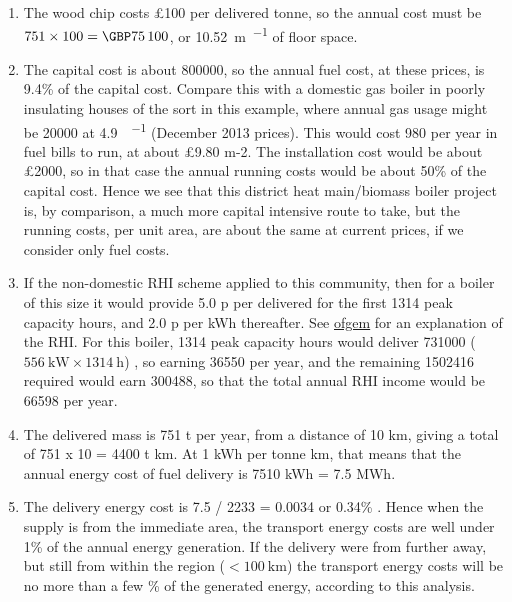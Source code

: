 \documentclass[parskip=half]{scrartcl}
\begin{document}
\begin{enumerate}
\item The wood chip costs £100 per delivered tonne, so the annual cost must be $751\times 100 = \SI{75100}[\GBP]{}$, or \SI{10.52}[\GBP]{\metre\per\squared} of floor space.

\item The capital cost is about \SI{800000}[\GBP]{}, so the annual fuel cost, at these prices, is 9.4\% of the capital cost. Compare this with a domestic gas boiler in poorly insulating houses of the sort in this example, where annual gas usage might be \SI{20000}{\kWhr} at \SI{4.9}{\pence\per\kWhr} (December 2013 prices). This would cost \SI{980}[\GBP]{} per year in fuel bills to run, at about £9.80 m-2. The installation cost would be about £2000, so in that case the annual running costs would be about 50\% of the capital cost. Hence we see that this district heat main/biomass boiler project is, by comparison, a much more capital intensive route to take, but the running costs, per unit area, are about the same at current prices, if we consider only fuel costs. 

\item If the non-domestic RHI scheme applied to this community, then for a boiler of this size it would provide 5.0 p per \si{\kWhr} delivered for the first 1314 peak capacity hours, and 2.0 p per kWh thereafter. See \href{https://www.ofgem.gov.uk/environmental-programmes/non-domestic-renewable-heat-incentive-rhi}{ofgem} for an explanation of the RHI. For this boiler, 1314 peak capacity hours would deliver \SI{731000}{\kWhr} ($\SI{556}{\kilo\watt}\times\SI{1314}{\hour}$) , so earning \SI{36550}[\GBP]{} per year, and the remaining \SI{1502416}{\kWhr} required would earn \SI{300488}[\GBP]{}, so that the total annual RHI income would be \SI{66598}[\GBP]{} per year.

\item The delivered mass is 751 t per year, from a distance of 10 km, giving a total of 751 x 10 = 4400 t km. At 1 kWh per tonne km, that means that the annual energy cost of fuel delivery is 7510 kWh = 7.5 MWh.

\item The delivery energy cost is 7.5 / 2233 =  0.0034 or 0.34\% . Hence when the supply is from the immediate area, the transport energy costs are well under 1\% of the annual energy generation. If the delivery were from further away, but still from within the region ($<\SI{100}{\kilo\metre}$) the transport energy costs will be no more than a few \% of the generated energy, according to this analysis.

\end{enumerate}
\printbibliography
\end{document}
